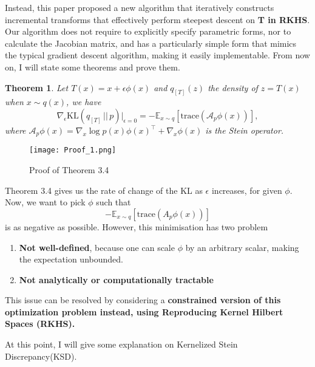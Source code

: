 \documentclass{article}
\newtheorem{theorem}{Theorem}[section] %
\begin{document}
Instead, this paper proposed a new algorithm that iteratively constructs incremental transforms that effectively perform steepest descent on \textbf{T in RKHS}. Our algorithm does not require to explicitly specify parametric forms, nor to calculate the Jacobian matrix, and has a particularly simple form that mimics the typical gradient descent algorithm, making it easily implementable. From now on, I will state some theorems and prove them.\\
\begin{tcolorbox}
\begin{theorem}
   
    Let \( T(x) = x + \epsilon \phi(x) \) and \( q_{[T]}(z) \) the density of \( z = T(x) \) when \( x \sim q(x) \), we have
\begin{equation}
    \nabla_\epsilon \text{KL}(q_{[T]} \,||\, p) \big|_{\epsilon=0} = -\mathbb{E}_{x \sim q} [\text{trace}(\mathcal{A}_p \phi(x))],
\end{equation}
where \( \mathcal{A}_p \phi(x) = \nabla_x \log p(x) \phi(x)^\top + \nabla_x \phi(x) \) is the Stein operator.
\end{theorem}
\end{tcolorbox}

\begin{figure}
    \centering
    \texttt{[image: Proof\_1.png]}
    \caption{Proof of Theorem 3.4}
    \label{fig:enter-label}
\end{figure}

Theorem 3.4 gives us the rate of change of the KL as $\epsilon$ increases, for given $\phi$. Now, we want to pick $\phi$ such that 
\[
- \mathbb{E}_{x \sim q} \left[\text{trace}( A_p \phi(x))\right]
\] 
is as negative as possible. However, this minimisation has two problem
\begin{enumerate}
    \item \textbf{Not well-defined}, because one can scale $\phi$ by an arbitrary scalar, making the expectation unbounded.
    \item \textbf{Not analytically or computationally tractable}
\end{enumerate}
This issue can be resolved by considering a \textbf{constrained version of this optimization problem instead, using Reproducing Kernel Hilbert Spaces (RKHS).}

At this point, I will give some explanation on Kernelized Stein Discrepancy(KSD).
\end{document}
